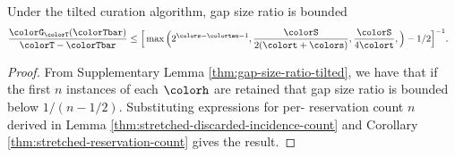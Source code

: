 \begin{theorem}
\label{thm:tilted-gap-size}
Under the tilted curation algorithm, gap size ratio is bounded
\begin{align*}
  \frac{\colorG_{\colorT}(\colorTbar)}{\colorT - \colorTbar}
  &\leq
  \Big[
    \max\Big(
      2^{\colors - \colortau - 1},
      \frac{\colorS}{2(\colort + \colors)},
      \frac{\colorS}{4\colort},
    \Big)
    - 1/2
  \Big]^{-1}.
\end{align*}
\end{theorem}
\begin{proof}

From Supplementary Lemma \ref{thm:gap-size-ratio-tilted}, we have that if the first $n$ instances of each \hv{} $\colorh$ are retained that gap size ratio is bounded below $1/(n - 1/2)$.
Substituting expressions for per-\hv{} reservation count $n$ derived in Lemma \ref{thm:stretched-discarded-incidence-count} and Corollary \ref{thm:stretched-reservation-count} gives the result.
\end{proof}
